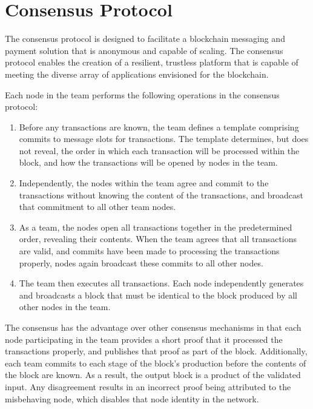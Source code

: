 \section{Consensus Protocol}
\label{section:consensus}

The \name consensus protocol is designed to facilitate a blockchain messaging and payment solution that is anonymous and capable of scaling. The \name consensus protocol enables the creation of a resilient, trustless platform that is capable of meeting the diverse array of applications envisioned for the blockchain.

Each node in the team performs the following operations in the \name consensus protocol:

\begin{enumerate}
    \item Before any transactions are known, the team defines a template comprising commits to message slots for transactions. The template determines, but does not reveal, the order in which each transaction will be processed within the block, and how the transactions will be opened by nodes in the team.
    \item Independently, the nodes within the team agree and commit to the transactions without knowing the content of the transactions, and broadcast that commitment to all other team nodes. 
    \item As a team, the nodes open all transactions together in the predetermined order, revealing their contents. When the team agrees that all transactions are valid, and commits have been made to processing the transactions properly, nodes again broadcast these commits to all other nodes.
    \item The team then executes all transactions. Each node independently generates and broadcasts a block that must be identical to the block produced by all other nodes in the team.
\end{enumerate}

The \name consensus has the advantage over other consensus mechanisms in that each node participating in the team provides a short proof that it processed the transactions properly, and publishes that proof as part of the block. Additionally, each team commits to each stage of the block’s production before the contents of the block are known. As a result, the output block is a product of the validated input. Any disagreement results in an incorrect proof being attributed to the misbehaving node, which disables that node identity in the network.

